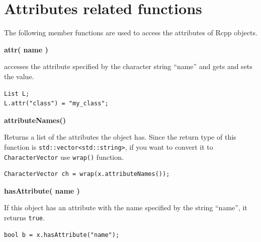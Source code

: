 \documentclass[]{book}
\theoremstyle{definition}
\theoremstyle{definition}
\theoremstyle{remark}
\begin{document}
\section{Attributes related
functions}\label{attributes-related-functions}

The following member functions are used to access the attributes of Rcpp
objects.

\textbf{attr( name )}

accesses the attribute specified by the character string ``name'' and
gets and sets the value.

\begin{verbatim}
List L;
L.attr("class") = "my_class";
\end{verbatim}

\textbf{attributeNames()}

Returns a list of the attributes the object has. Since the return type
of this function is
\texttt{std::vector\textless{}std::string\textgreater{}}, if you want to
convert it to \texttt{CharacterVector} use \texttt{wrap()} function.

\begin{verbatim}
CharacterVector ch = wrap(x.attributeNames());
\end{verbatim}

\textbf{hasAttribute( name )}

If this object has an attribute with the name specified by the string
``name'', it returns \texttt{true}.

\begin{verbatim}
bool b = x.hasAttribute("name");
\end{verbatim}
\end{document}
